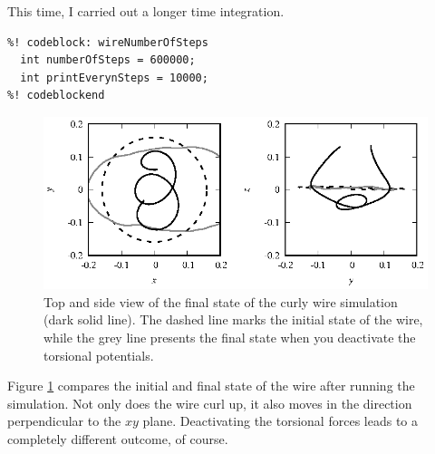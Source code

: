 This time, I carried out a longer time integration.
\begin{lstlisting}
%! codeblock: wireNumberOfSteps
  int numberOfSteps = 600000;
  int printEverynSteps = 10000;
%! codeblockend
\end{lstlisting}

\begin{figure}
  \centering
  \includegraphics[width = \textwidth]{figures/curlyWire.eps}
  \caption{\label{curlyWire}Top and side view of the final state of the curly
           wire simulation (dark solid line). The dashed line marks the initial
           state of the wire, while the grey line presents the final state when
           you deactivate the torsional potentials.}
\end{figure}

Figure \ref{curlyWire} compares the initial and final state of the wire after
running the simulation. Not only does the wire curl up, it also moves in the
direction perpendicular to the $xy$ plane. Deactivating the torsional forces
leads to a completely different outcome, of course.

